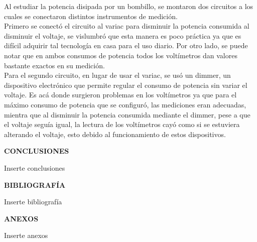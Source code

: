 \documentclass[12pt]{article}
\begin{document}
\begin{enumerate}
		\noindent Al estudiar la potencia disipada por un bombillo, se montaron dos circuitos a los cuales se conectaron distintos instrumentos de medición.\\
		
		\noindent Primero se conectó el circuito al variac para disminuir la potencia consumida al disminuir el voltaje, se vislumbró que esta manera es poco práctica ya que es difícil adquirir tal tecnología en casa para el uso diario. Por otro lado, se puede notar que en ambos consumos de potencia todos los voltímetros dan valores bastante exactos en su medición.\\
		
		\noindent Para el segundo circuito, en lugar de usar el variac, se usó un dimmer, un dispositivo electrónico que permite regular el consumo de potencia sin variar el voltaje. Es acá donde surgieron problemas en los voltímetros ya que para el máximo consumo de potencia que se configuró, las mediciones eran adecuadas, mientra que al disminuir la potencia consumida mediante el dimmer, pese a que el voltaje seguía igual, la lectura de los voltímetros cayó como si se estuviera alterando el voltaje, esto debido al funcionamiento de estos dispositivos.
		
	\end{enumerate}
	
	\newpage
	
	\begin{center}
		\textbf{\large CONCLUSIONES}\\
	\end{center}
	
	Inserte conclusiones
	
	\newpage
	
	\begin{center}
		\textbf{\large BIBLIOGRAFÍA}\\
	\end{center}
	
	Inserte bibliografía
	
	\newpage
	
	\begin{center}
		\textbf{\large ANEXOS}\\
	\end{center}
	
	Inserte anexos
	
\end{document}
